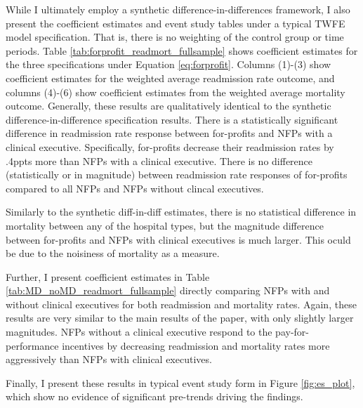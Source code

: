 \documentclass[12pt]{article}
\begin{document}
While I ultimately employ a synthetic difference-in-differences framework, I also present the coefficient estimates and event study tables under a typical TWFE model specification. That is, there is no weighting of the control group or time periods. Table \ref{tab:forprofit_readmort_fullsample} shows coefficient estimates for the three specifications under Equation \ref{eq:forprofit}. Columns (1)-(3) show coefficient estimates for the weighted average readmission rate outcome, and columns (4)-(6) show coefficient estimates from the weighted average mortality outcome. Generally, these results are qualitatively identical to the synthetic difference-in-difference specification results. There is a statistically significant difference in readmission rate response between for-profits and NFPs with a clinical executive. Specifically, for-profits decrease their readmission rates by .4ppts more than NFPs with a clinical executive. There is no difference (statistically or in magnitude) between readmission rate responses of for-profits compared to all NFPs and NFPs without clincal executives. 

Similarly to the synthetic diff-in-diff estimates, there is no statistical difference in mortality between any of the hospital types, but the magnitude difference between for-profits and NFPs with clinical executives is much larger. This oculd be due to the noisiness of mortality as a measure. 


Further, I present coefficient estimates in Table \ref{tab:MD_noMD_readmort_fullsample} directly comparing NFPs with and without clinical executives for both readmission and mortality rates. Again, these results are very similar to the main results of the paper, with only slightly larger magnitudes. NFPs without a clinical executive respond to the pay-for-performance incentives by decreasing readmission and mortality rates more aggressively than NFPs with clinical executives. 


Finally, I present these results in typical event study form in Figure \ref{fig:es_plot}, which show no evidence of significant pre-trends driving the findings. 
\end{document}
